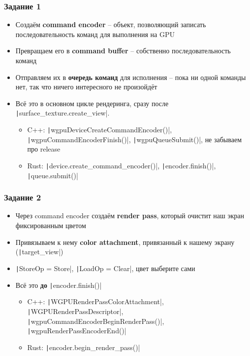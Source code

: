 \documentclass[10pt]{beamer}
\begin{document}
\begin{frame}[fragile]
\frametitle{Задание 1}
\begin{itemize}
\item Создаём \textbf{command encoder} -- объект, позволяющий записать последовательность команд для выполнения на GPU
\item Превращаем его в \textbf{command buffer} -- собственно последовательность команд
\item Отправляем их в \textbf{очередь команд} для исполнения -- пока ни одной команды нет, так что ничего интересного не произойдёт
\item Всё это в основном цикле рендеринга, сразу после \texttt|surface_texture.create_view|.
\begin{itemize}
\item C++: \texttt|wgpuDeviceCreateCommandEncoder()|, \texttt|wgpuCommandEncoderFinish()|, \texttt|wgpuQueueSubmit()|, не забываем про release
\item Rust: \texttt|device.create_command_encoder()|, \texttt|encoder.finish()|, \texttt|queue.submit()|
\end{itemize}
\end{itemize}
\end{frame}

\begin{frame}[fragile]
\frametitle{Задание 2}
\begin{itemize}
\item Через command encoder создаём \textbf{render pass}, который очистит наш экран фиксированным цветом
\item Привязываем к нему \textbf{color attachment}, привязанный к нашему экрану (\texttt|target_view|)
\item \texttt|StoreOp = Store|, \texttt|LoadOp = Clear|, цвет выберите сами
\item Всё это \textbf{до} \texttt|encoder.finish()|
\begin{itemize}
\item C++: \texttt|WGPURenderPassColorAttachment|, \texttt|WGPURenderPassDescriptor|, \texttt|wgpuCommandEncoderBeginRenderPass()|, \texttt|wgpuRenderPassEncoderEnd()|
\item Rust: \texttt|encoder.begin_render_pass()|
\end{itemize}
\end{itemize}
\end{frame}
\end{document}
